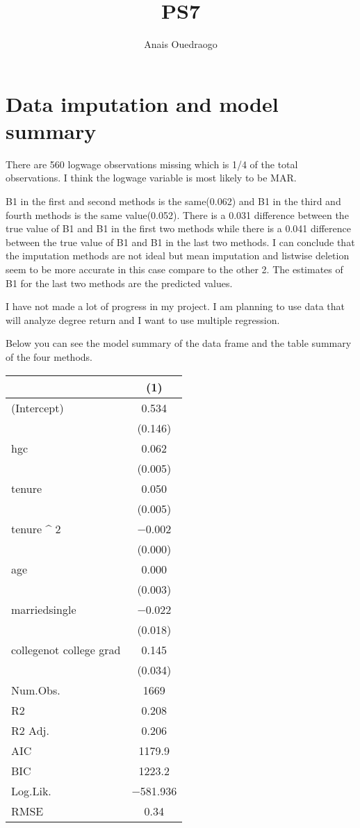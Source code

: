 \documentclass{article}
\title{PS7}
\author{Anais Ouedraogo}
\begin{document}
\maketitle



\section{Data imputation and model summary}

There are 560 logwage observations missing which is 1/4 of the total observations. I think the logwage variable is most likely to be MAR.

B1 in the first and second methods is the same(0.062) and B1 in the third and fourth methods is the same value(0.052). There is a 0.031 difference between the true value of B1 and B1 in the first two methods while there is a 0.041 difference between the true value of B1 and B1 in the last two methods. I can conclude that the imputation methods are not ideal but mean imputation and listwise deletion seem to be more accurate in this case compare to the other 2. The estimates of B1 for the last two methods are the predicted values.


 I have not made a lot of progress in my project. I am planning to use data that will analyze degree return and I want to use multiple regression.

 Below you can see the model summary of the data frame and the table summary of the four methods.

\begin{table}
\centering
\begin{tabular}[t]{lc}
\toprule
  & (1)\\
\midrule
(Intercept) & \num{0.534}\\
 & (\num{0.146})\\
hgc & \num{0.062}\\
 & \vphantom{1} (\num{0.005})\\
tenure & \num{0.050}\\
 & (\num{0.005})\\
 tenure ^ 2 & \num{-0.002}\\
 & (\num{0.000})\\
age & \num{0.000}\\
 & (\num{0.003})\\
marriedsingle & \num{-0.022}\\
 & (\num{0.018})\\
collegenot college grad & \num{0.145}\\
 & (\num{0.034})\\
\midrule
Num.Obs. & \num{1669}\\
R2 & \num{0.208}\\
R2 Adj. & \num{0.206}\\
AIC & \num{1179.9}\\
BIC & \num{1223.2}\\
Log.Lik. & \num{-581.936}\\
RMSE & \num{0.34}\\
\bottomrule
\end{tabular}
\end{table}
\end{document}
